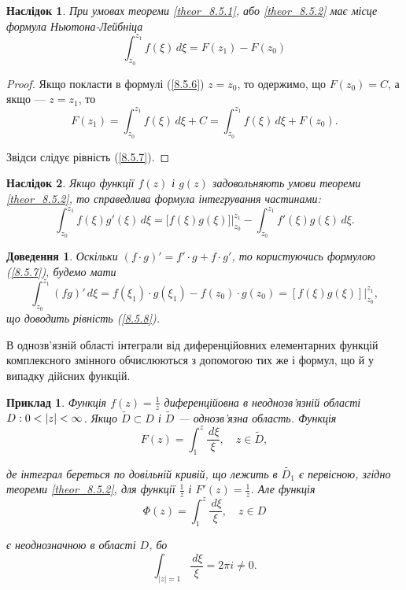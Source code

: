 \documentclass[12pt,fleqn]{article}
\newtheorem{exm}{Приклад}[section]
\theoremstyle{theorem}
\theoremstyle{proof}
\newtheorem*{dov}{Доведення}
\newtheorem{corollary}{Наслідок}[section]
\numberwithin{figure}{section}
\numberwithin{equation}{section}
\begin{document}
\begin{corollary}\label{corollary_8.5.2}
При умовах теореми \ref{theor_8.5.1}, або \ref{theor_8.5.2} має місце формула Ньютона-Лейбніца
\begin{equation}\label{8.5.7}
\int_{z_0}^{z_1}f(\xi)\,d\xi = F(z_1) - F(z_0)
\end{equation}
\end{corollary}
\begin{proof}
Якщо покласти в формулі (\ref{8.5.6}) $z=z_0$, то одержимо, що $F(z_0)=C$, а якщо --- $z=z_1$, то
\[F(z_1)=\int_{z_0}^{z_1}f(\xi)\,d\xi + C = \int_{z_0}^{z_1}f(\xi)\,d\xi + F(z_0). \]

Звідси слідує рівність (\ref{8.5.7}).
\end{proof}

\begin{corollary}\label{corollary_8.5.3}
Якщо функції $f(z)$ і $g(z)$ задовольняють умови теореми \ref{theor_8.5.2}, то справедлива формула інтегрування частинами:
\begin{equation}\label{8.5.8}
\int_{z_0}^{z_1} f(\xi)g'(\xi)\,d\xi = \bigg[f(\xi)g(\xi)\bigg] \bigg|_{z_0}^{z_1}-\int_{z_0}^{z_1}f'(\xi)g(\xi)\,d\xi.
\end{equation}
\end{corollary}
\begin{dov}
Оскільки $(f\cdot g)'=f'\cdot g + f \cdot g'$, то користуючись формулою (\ref{8.5.7}), будемо мати
\[ \int_{z_0}^{z_1}(fg)'\,d\xi=f(\xi_1)\cdot g(\xi_1)-f(z_0)\cdot g(z_0) = [f(\xi)g(\xi)]\bigg|_{z_0}^{z_1}, \]
що доводить рівність (\ref{8.5.8}).
\end{dov}

В однозв'язній області інтеграли від диференційовних елементарних функцій комплексного змінного обчислюються з допомогою тих же і формул, що й у випадку дійсних функцій.

\begin{exm}\label{exm_8.5.1}
Функція $f(z)=\frac{1}{z}$ диференційовна в неоднозв'язній області $\\ D:0<|z|<\infty$. Якщо $ \widetilde{D}\subset D$ і $\widetilde{D}$ --- однозв'язна область. Функція
\[ F(z) = \int_{1}^{z} \frac{\,d\xi}{\xi}, \quad z \in \widetilde{D}, \]

де інтеграл береться по довільній кривій, що лежить в $\widetilde{D_1}$ є первісною, згідно теореми \ref{theor_8.5.2}, для функції $\frac{1}{z}$ і $F'(z)=\frac{1}{z}$. Але функція
\[ \Phi (z)= \int_{1}^{z} \frac{\,d\xi}{\xi}, \quad z \in D \]

є неоднозначною в області $D$, бо
\[ \int_{|z|=1} \frac{\,d\xi}{\xi}=2\pi i \neq 0. \]
\end{exm}
\end{document}

